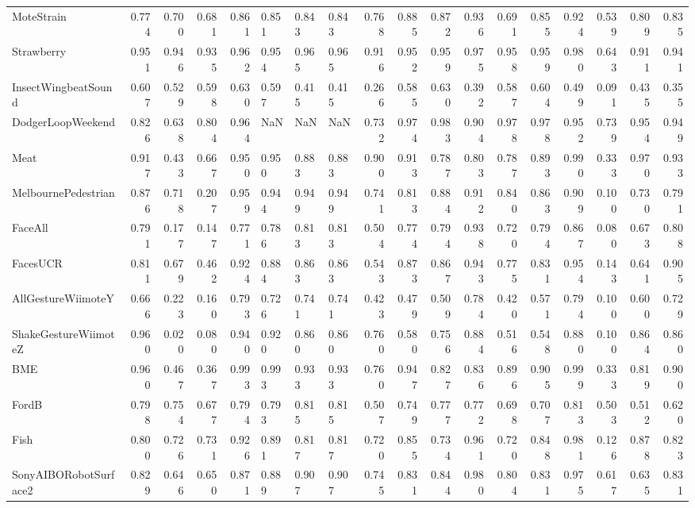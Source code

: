 \begin{tabular}{lrrrrlllrrrrrrrrrr}
MoteStrain & 0.774 & 0.700 & 0.681 & 0.861 & 0.851 & 0.843 & 0.843 & 0.768 & 0.885 & 0.872 & 0.936 & 0.691 & 0.855 & 0.924 & 0.539 & 0.809 & 0.835 \\
Strawberry & 0.951 & 0.946 & 0.935 & 0.962 & 0.954 & 0.965 & 0.965 & 0.916 & 0.952 & 0.959 & 0.975 & 0.958 & 0.959 & 0.980 & 0.643 & 0.911 & 0.941 \\
InsectWingbeatSound & 0.607 & 0.529 & 0.598 & 0.630 & 0.597 & 0.415 & 0.415 & 0.266 & 0.585 & 0.630 & 0.392 & 0.587 & 0.604 & 0.499 & 0.091 & 0.435 & 0.355 \\
DodgerLoopWeekend & 0.826 & 0.638 & 0.804 & 0.964 & NaN & NaN & NaN & 0.732 & 0.974 & 0.983 & 0.904 & 0.978 & 0.978 & 0.952 & 0.739 & 0.954 & 0.949 \\
Meat & 0.917 & 0.433 & 0.667 & 0.950 & 0.950 & 0.883 & 0.883 & 0.900 & 0.913 & 0.787 & 0.803 & 0.787 & 0.893 & 0.990 & 0.333 & 0.970 & 0.933 \\
MelbournePedestrian & 0.876 & 0.718 & 0.207 & 0.959 & 0.944 & 0.949 & 0.949 & 0.741 & 0.813 & 0.884 & 0.912 & 0.840 & 0.863 & 0.909 & 0.100 & 0.730 & 0.791 \\
FaceAll & 0.791 & 0.177 & 0.147 & 0.771 & 0.786 & 0.813 & 0.813 & 0.504 & 0.774 & 0.794 & 0.938 & 0.720 & 0.794 & 0.867 & 0.080 & 0.673 & 0.808 \\
FacesUCR & 0.811 & 0.679 & 0.462 & 0.924 & 0.884 & 0.863 & 0.863 & 0.543 & 0.873 & 0.867 & 0.943 & 0.775 & 0.831 & 0.954 & 0.143 & 0.641 & 0.905 \\
AllGestureWiimoteY & 0.666 & 0.223 & 0.160 & 0.793 & 0.726 & 0.741 & 0.741 & 0.423 & 0.479 & 0.509 & 0.784 & 0.420 & 0.571 & 0.794 & 0.100 & 0.600 & 0.729 \\
ShakeGestureWiimoteZ & 0.960 & 0.020 & 0.080 & 0.940 & 0.920 & 0.860 & 0.860 & 0.760 & 0.580 & 0.756 & 0.884 & 0.516 & 0.548 & 0.880 & 0.100 & 0.864 & 0.860 \\
BME & 0.960 & 0.467 & 0.367 & 0.993 & 0.993 & 0.933 & 0.933 & 0.760 & 0.947 & 0.827 & 0.836 & 0.896 & 0.905 & 0.999 & 0.333 & 0.819 & 0.900 \\
FordB & 0.798 & 0.754 & 0.677 & 0.794 & 0.793 & 0.815 & 0.815 & 0.507 & 0.749 & 0.777 & 0.772 & 0.698 & 0.707 & 0.813 & 0.503 & 0.512 & 0.620 \\
Fish & 0.800 & 0.726 & 0.731 & 0.926 & 0.891 & 0.817 & 0.817 & 0.720 & 0.855 & 0.734 & 0.961 & 0.720 & 0.848 & 0.981 & 0.126 & 0.878 & 0.823 \\
SonyAIBORobotSurface2 & 0.829 & 0.646 & 0.650 & 0.871 & 0.889 & 0.907 & 0.907 & 0.745 & 0.831 & 0.844 & 0.980 & 0.804 & 0.831 & 0.975 & 0.617 & 0.635 & 0.831 \\

\end{tabular}
